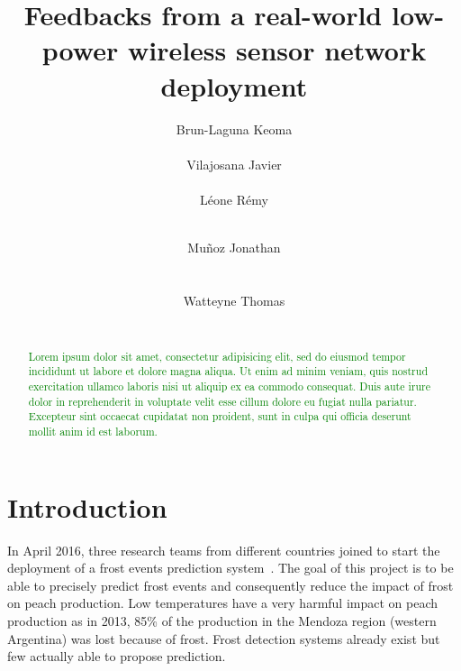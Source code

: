 \documentclass{sig-alternate}
\newcommand{\lorem}               {\textcolor{green}{Lorem ipsum dolor sit amet, consectetur adipisicing elit, sed do eiusmod tempor incididunt ut labore et dolore magna aliqua. Ut enim ad minim veniam, quis nostrud exercitation ullamco laboris nisi ut aliquip ex ea commodo consequat. Duis aute irure dolor in reprehenderit in voluptate velit esse cillum dolore eu fugiat nulla pariatur. Excepteur sint occaecat cupidatat non proident, sunt in culpa qui officia deserunt mollit anim id est laborum.}}
\begin{document}
\title{Feedbacks from a real-world low-power wireless sensor network deployment}

\author{
  \alignauthor Brun-Laguna Keoma\\
    \\
  \alignauthor Vilajosana Javier\\
    \\
  \alignauthor Léone Rémy \\
    \\
  \and
  \alignauthor Muñoz Jonathan\\
    \\
    \\
  \alignauthor Watteyne Thomas \\
    \\
}

\maketitle

\begin{abstract}
\lorem
\end{abstract}


\section{Introduction}
\label{sec:intro}


In April 2016, three research teams from different countries joined to start the deployment of a frost events prediction system~\cite{watteyne16peach}.
The goal of this project is to be able to precisely predict frost events and consequently reduce the impact of frost on peach production.
Low temperatures have a very harmful impact on peach production as in 2013, 85\% of the production in the Mendoza region (western Argentina) was lost because of frost.
Frost detection systems already exist but few actually able to propose prediction.
\end{document}

